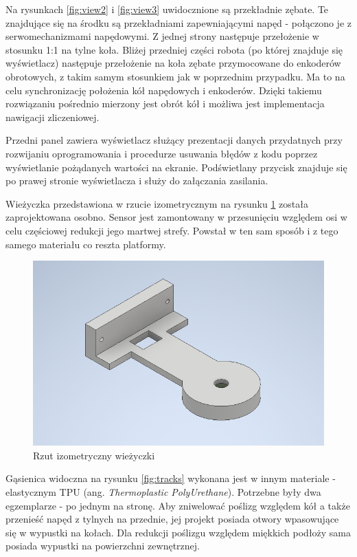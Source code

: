 Na rysunkach \ref{fig:view2} i \ref{fig:view3} uwidocznione są przekładnie zębate. Te znajdujące się na środku są przekładniami zapewniającymi napęd - połączono je z serwomechanizmami napędowymi. Z jednej strony następuje przełożenie w stosunku 1:1 na tylne koła. Bliżej przedniej części robota (po której znajduje się wyświetlacz) następuje przełożenie na koła zębate przymocowane do enkoderów obrotowych, z takim samym stosunkiem jak w poprzednim przypadku. Ma to na celu synchronizację położenia kół napędowych i enkoderów. Dzięki takiemu rozwiązaniu pośrednio mierzony jest obrót kół i możliwa jest implementacja nawigacji zliczeniowej.

Przedni panel zawiera wyświetlacz służący prezentacji danych przydatnych przy rozwijaniu oprogramowania i procedurze usuwania błędów z kodu poprzez wyświetlanie pożądanych wartości na ekranie. Podświetlany przycisk znajduje się po prawej stronie wyświetlacza i służy do załączania zasilania. 

Wieżyczka przedstawiona w rzucie izometrycznym na rysunku \ref{fig:tower} została zaprojektowana osobno. Sensor jest zamontowany w przesunięciu względem osi w celu częściowej redukcji jego martwej strefy. Powstał w ten sam sposób i z tego samego materiału co reszta platformy.

\begin{figure}[ht]
	\centering
		\includegraphics[width=0.6\linewidth]{rys/arm.png}
	\caption{Rzut izometryczny wieżyczki}
	\label{fig:tower}
\end{figure}

Gąsienica widoczna na rysunku \ref{fig:tracks} wykonana jest w innym materiale - elastycznym TPU (ang. \emph{Thermoplastic PolyUrethane}). Potrzebne były dwa egzemplarze - po jednym na stronę. Aby zniwelować poślizg względem kół a także przenieść napęd z tylnych na przednie, jej projekt posiada otwory wpasowujące się w wypustki na kołach. Dla redukcji poślizgu względem miękkich podłoży sama posiada wypustki na powierzchni zewnętrznej.

